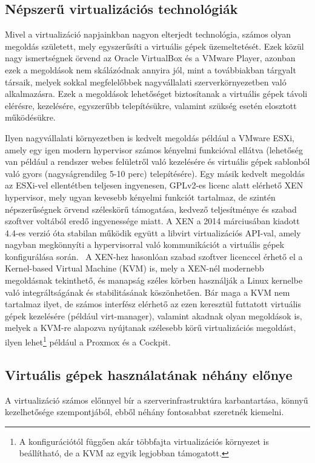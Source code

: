 \subsection{Népszerű virtualizációs technológiák}
Mivel a virtualizáció napjainkban nagyon elterjedt technológia, számos olyan megoldás született, mely egyszerűsíti a virtuális gépek üzemeltetését. Ezek közül nagy ismertségnek örvend az Oracle VirtualBox és a VMware Player, azonban ezek a megoldások nem skálázódnak annyira jól, mint a továbbiakban tárgyalt társaik, melyek sokkal megfelelőbbek nagyvállalati szerverkörnyezetben való alkalmazásra. Ezek a megoldások lehetőséget biztosítanak a virtuális gépek távoli elérésre, kezelésére, egyszerűbb telepítésükre, valamint szükség esetén elosztott működésükre.

Ilyen nagyvállalati környezetben is kedvelt megoldás például a VMware ESXi, amely egy igen modern hypervisor számos kényelmi funkcióval ellátva (lehetőség van például a rendszer webes felületről való kezelésére és virtuális gépek sablonból való gyors (nagyságrendileg 5-10 perc) telepítésére).
Egy másik kedvelt megoldás az ESXi-vel ellentétben teljesen ingyenesen, GPLv2-es licenc alatt elérhető XEN hypervisor, mely ugyan kevesebb kényelmi funkciót tartalmaz, de szintén népszerűségnek örvend széleskörű támogatása, kedvező teljesítménye és szabad szoftver voltából eredő ingyenessége miatt. A XEN a 2014 márciusában kiadott 4.4-es verzió óta stabilan működik együtt a libvirt virtualizációs API-val, amely nagyban megkönnyíti a hypervisorral való kommunikációt a virtuális gépek konfigurálása során.~\cite{Xen44ReleaseNotes}
A XEN-hez hasonlóan szabad szoftver licenccel érhető el a Kernel-based Virtual Machine (KVM) is, mely a XEN-nél modernebb megoldásnak tekinthető, és manapság széles körben használják a Linux kernelbe való integráltságának és stabilitásának köszönhetően. Bár maga a KVM nem tartalmaz ilyet, de számos interfész elérhető az ezen keresztül futtatott virtuális gépek kezelésére (például virt-manager), valamint akadnak olyan megoldások is, melyek a KVM-re alapozva nyújtanak szélesebb körű virtualizációs megoldást, ilyen lehet\footnote{A konfigurációtól függően akár többfajta virtualizációs környezet is beállítható, de a KVM az egyik legjobban támogatott.} például a Proxmox és a Cockpit.


\subsection{Virtuális gépek használatának néhány előnye}
A virtualizáció számos előnnyel bír a szerverinfrastruktúra karbantartása, könnyű kezelhetősége szempontjából, ebből néhány fontosabbat szeretnék kiemelni.

